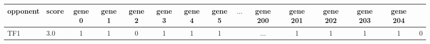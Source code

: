 \begin{tabular}{llccccccccccccc}
\toprule
opponent &  score &  gene 0 &  gene 1 &  gene 2 &  gene 3 &  gene 4 &  gene 5 & \(\dots\) &  gene 200 &  gene 201 &  gene 202 &  gene 203 &  gene 204 \\
\midrule
TF1 &    3.0 &       1 &       1 &       0 &       1 &       1 &       1 &  & \(\dots\) &  1 &         1 &         1 &         1 &         0 \\
\bottomrule
\end{tabular}
